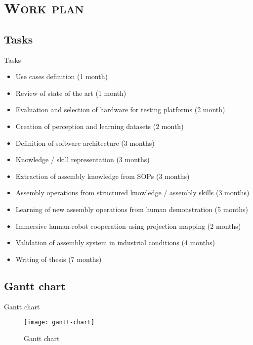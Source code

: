 \section{\scshape Work plan}\label{sec:workplan}

\subsection{Tasks}
\begin{frame}{Tasks}
	\begin{footnotesize}
		\begin{itemize}
			\item Use cases definition (1 month)
			\item Review of state of the art (1 month)
			\item Evaluation and selection of hardware for testing platforms (2 month)
			\item Creation of perception and learning datasets (2 month)
			\item Definition of software architecture (3 months)
			\item Knowledge / skill representation (3 months)
			\item Extraction of assembly knowledge from SOPs (3 months)
			\item Assembly operations from structured knowledge / assembly skills (3 months)
			\item Learning of new assembly operations from human demonstration (5 months)
			\item Immersive human-robot cooperation using projection mapping (2 months)
			\item Validation of assembly system in industrial conditions (4 months)
			\item Writing of thesis (7 months)
		\end{itemize}
	\end{footnotesize}
\end{frame}

\subsection{Gantt chart}
\begin{frame}{Gantt chart}
	\begin{figure}
		\centering
		\texttt{[image: gantt-chart]}
		\caption{Gantt chart}
	\end{figure}
\end{frame}
